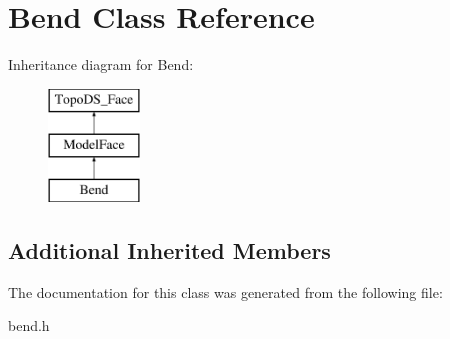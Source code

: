 \hypertarget{classBend}{\section{Bend Class Reference}
\label{classBend}
}
Inheritance diagram for Bend\-:\begin{figure}[H]
\begin{center}
\leavevmode
\includegraphics[height=3.000000cm]{classBend}
\end{center}
\end{figure}
\subsection*{Additional Inherited Members}


The documentation for this class was generated from the following file\-:\begin{DoxyCompactItemize}
\item 
bend.\-h\end{DoxyCompactItemize}
